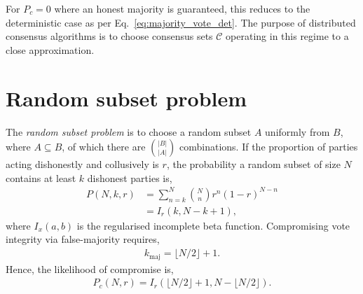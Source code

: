 \documentclass[twocolumn, aps, amsmath, amssymb, nofootinbib, superscriptaddress, longbibliography, floatfix, eqsecnum, rmp]{revtex4-2}
\let\oldalgorithmic\algorithmic
\let\endoldalgorithmic\endalgorithmic
\renewenvironment{algorithmic}
{\begin{adjustwidth}{-1em}{}\oldalgorithmic}
{\endoldalgorithmic\end{adjustwidth}}
\begin{document}
For \mbox{$P_c=0$} where an honest majority is guaranteed, this reduces to the deterministic case as per Eq.~\eqref{eq:majority_vote_det}. The purpose of distributed consensus algorithms is to choose consensus sets $\mathcal{C}$ operating in this regime to a close approximation.


\section{Random subset problem} \label{sec:random_subset_problem}

The \emph{random subset problem} is to choose a random subset $A$ uniformly from $B$, where $A\subseteq B$, of which there are $\binom{|B|}{|A|}$ combinations. If the proportion of parties acting dishonestly and collusively is $r$, the probability a random subset of size $N$ contains at least $k$ dishonest parties is,
\begin{align}
P(N,k,r) &= \sum_{n=k}^{N} \binom{N}{n} {r}^n (1-r)^{N-n} \nonumber\\
	&= I_r(k,N-k+1),
\end{align}
where $I_x(a,b)$ is the regularised incomplete beta function. Compromising vote integrity via false-majority requires,
\begin{align}
	k_\mathrm{maj} = \lfloor N/2 \rfloor + 1.
\end{align}
Hence, the likelihood of compromise is,
\begin{align}
	P_c(N,r) = I_r(\lfloor N/2 \rfloor + 1,N-\lfloor N/2 \rfloor).
\end{align}
\end{document}
